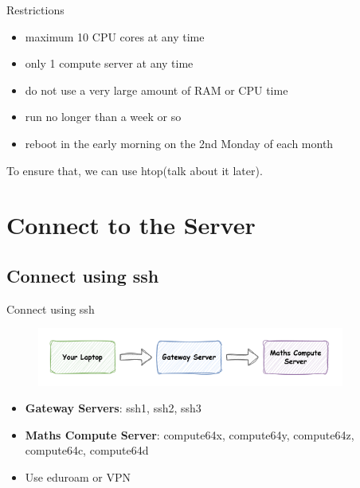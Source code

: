 \documentclass[10pt]{beamer}
\begin{document}
\begin{frame}[fragile]{Restrictions}

\begin{itemize}
    \item maximum 10 CPU cores at any time
    \item only 1 compute server at any time
    \item do not use a very large amount of RAM or CPU time
    \item run no longer than a week or so
    \item reboot in the early morning on the 2nd Monday of each month
\end{itemize}

To ensure that, we can use htop(talk about it later). 

\end{frame}

\section{Connect to the Server}

\subsection{Connect using ssh}

\begin{frame}[fragile]{Connect using ssh}

\begin{figure}[!ht]
\centering
\includegraphics[width = 0.9\textwidth]{images/maths_server_connect_steps.png}
\end{figure}

\begin{itemize}
    \item \textbf{Gateway Servers}: ssh1, ssh2, ssh3
    \item \textbf{Maths Compute Server}: compute64x, compute64y, compute64z, compute64c, compute64d
    \newline
    \item Use eduroam or VPN
\end{itemize}

\end{frame}
\end{document}
